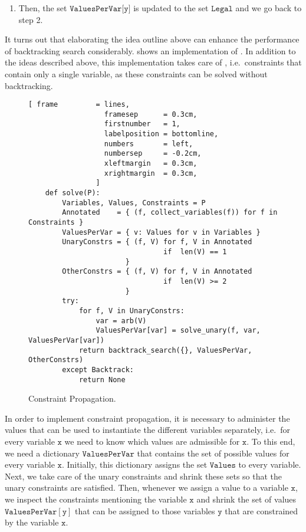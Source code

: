 \begin{enumerate}
\begin{enumerate}
      \item Then, the set $\texttt{ValuesPerVar[y]}$ is updated to the set $\texttt{Legal}$ and we go back to
            step 2.
      \end{enumerate}
\end{enumerate}
It turns out that elaborating the idea outline above can enhance the performance of backtracking search
considerably.   shows an implementation of 
.  In addition to the ideas described above, this implementation takes care of
, i.e.~constraints that contain only a single variable, as these constraints can be
solved without backtracking.


\begin{figure}[!ht]
\centering
\begin{Verbatim}[ frame         = lines, 
                  framesep      = 0.3cm, 
                  firstnumber   = 1,
                  labelposition = bottomline,
                  numbers       = left,
                  numbersep     = -0.2cm,
                  xleftmargin   = 0.3cm,
                  xrightmargin  = 0.3cm,
                ]
    def solve(P):
        Variables, Values, Constraints = P
        Annotated    = { (f, collect_variables(f)) for f in Constraints }
        ValuesPerVar = { v: Values for v in Variables }
        UnaryConstrs = { (f, V) for f, V in Annotated
                                if  len(V) == 1
                       }
        OtherConstrs = { (f, V) for f, V in Annotated
                                if  len(V) >= 2
                       }
        try:
            for f, V in UnaryConstrs:
                var = arb(V)
                ValuesPerVar[var] = solve_unary(f, var, ValuesPerVar[var])
            return backtrack_search({}, ValuesPerVar, OtherConstrs)
        except Backtrack:
            return None
\end{Verbatim}
\vspace*{-0.3cm}
\caption{Constraint Propagation.}
\label{fig:Constraint-Propagation-Solver.ipynb:solve}
\end{figure}

In order to implement constraint propagation, it is necessary to administer the values that can be used
to instantiate the different variables separately, i.e.~for every variable $\texttt{x}$ we need to know which
values are admissible for $\texttt{x}$.  To this end, we need a dictionary $\mathtt{ValuesPerVar}$ that
contains the set of possible values for every variable $\texttt{x}$.  Initially, this dictionary assigns the
set $\texttt{Values}$ to every variable.  Next, we take care of the unary constraints and shrink these sets so
that the unary constraints are satisfied.  Then, whenever we assign a value to a variable $\mathtt{x}$,  we
inspect the constraints mentioning the variable $\mathtt{x}$ and shrink the set of values
$\mathtt{ValuesPerVar}[\mathtt{y}]$ that can be assigned to those variables $\mathtt{y}$ that are constrained by the
variable  $\mathtt{x}$. 

